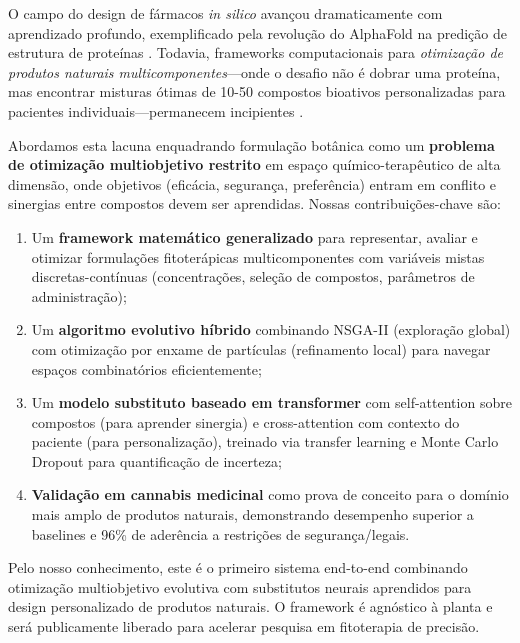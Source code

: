 \documentclass[11pt,a4paper]{article}
\begin{document}
O campo do design de fármacos \textit{in silico} avançou dramaticamente com aprendizado profundo, exemplificado pela revolução do AlphaFold na predição de estrutura de proteínas \cite{Jumper2021}. Todavia, frameworks computacionais para \textit{otimização de produtos naturais multicomponentes}—onde o desafio não é dobrar uma proteína, mas encontrar misturas ótimas de 10-50 compostos bioativos personalizadas para pacientes individuais—permanecem incipientes \cite{Newman2020,Atanasov2021}.

Abordamos esta lacuna enquadrando formulação botânica como um \textbf{problema de otimização multiobjetivo restrito} em espaço químico-terapêutico de alta dimensão, onde objetivos (eficácia, segurança, preferência) entram em conflito e sinergias entre compostos devem ser aprendidas. Nossas contribuições-chave são:

\begin{enumerate}
    \item Um \textbf{framework matemático generalizado} para representar, avaliar e otimizar formulações fitoterápicas multicomponentes com variáveis mistas discretas-contínuas (concentrações, seleção de compostos, parâmetros de administração);
    
    \item Um \textbf{algoritmo evolutivo híbrido} combinando NSGA-II (exploração global) com otimização por enxame de partículas (refinamento local) para navegar espaços combinatórios eficientemente;
    
    \item Um \textbf{modelo substituto baseado em transformer} com self-attention sobre compostos (para aprender sinergia) e cross-attention com contexto do paciente (para personalização), treinado via transfer learning e Monte Carlo Dropout para quantificação de incerteza;
    
    \item \textbf{Validação em cannabis medicinal} como prova de conceito para o domínio mais amplo de produtos naturais, demonstrando desempenho superior a baselines e 96\% de aderência a restrições de segurança/legais.
\end{enumerate}

Pelo nosso conhecimento, este é o primeiro sistema end-to-end combinando otimização multiobjetivo evolutiva com substitutos neurais aprendidos para design personalizado de produtos naturais. O framework é agnóstico à planta e será publicamente liberado para acelerar pesquisa em fitoterapia de precisão.
\end{document}
